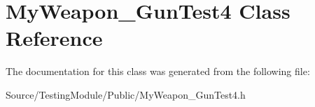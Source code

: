 \hypertarget{class_my_weapon___gun_test4}{}\section{My\+Weapon\+\_\+\+Gun\+Test4 Class Reference}
\label{class_my_weapon___gun_test4}


The documentation for this class was generated from the following file\+:\begin{DoxyCompactItemize}
\item 
Source/\+Testing\+Module/\+Public/My\+Weapon\+\_\+\+Gun\+Test4.\+h\end{DoxyCompactItemize}
